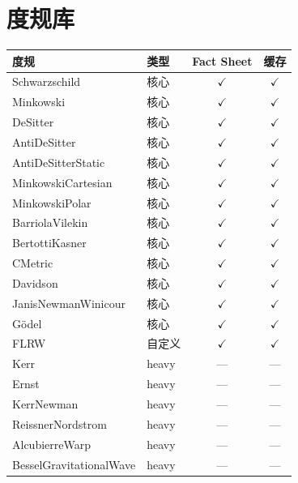 \documentclass[11pt,a4paper]{article}
\begin{document}
\section{度规库}

\begin{table}[h]\centering\small
\begin{tabular}{llcc}
\toprule
\textbf{度规} & \textbf{类型} & \textbf{Fact Sheet} & \textbf{缓存} \\
\midrule
Schwarzschild           & 核心   & $\checkmark$ & $\checkmark$ \\
Minkowski               & 核心   & $\checkmark$ & $\checkmark$ \\
DeSitter                & 核心   & $\checkmark$ & $\checkmark$ \\
AntiDeSitter            & 核心   & $\checkmark$ & $\checkmark$ \\
AntiDeSitterStatic      & 核心   & $\checkmark$ & $\checkmark$ \\
MinkowskiCartesian      & 核心   & $\checkmark$ & $\checkmark$ \\
MinkowskiPolar          & 核心   & $\checkmark$ & $\checkmark$ \\
BarriolaVilekin         & 核心   & $\checkmark$ & $\checkmark$ \\
BertottiKasner          & 核心   & $\checkmark$ & $\checkmark$ \\
CMetric                 & 核心   & $\checkmark$ & $\checkmark$ \\
Davidson                & 核心   & $\checkmark$ & $\checkmark$ \\
JanisNewmanWinicour     & 核心   & $\checkmark$ & $\checkmark$ \\
G\"odel                 & 核心   & $\checkmark$ & $\checkmark$ \\
FLRW                    & 自定义 & $\checkmark$ & $\checkmark$ \\
\midrule
Kerr                    & heavy & — & — \\
Ernst                   & heavy & — & — \\
KerrNewman              & heavy & — & — \\
ReissnerNordstrom       & heavy & — & — \\
AlcubierreWarp          & heavy & — & — \\
BesselGravitationalWave & heavy & — & — \\
\bottomrule
\end{tabular}
\end{table}
\end{document}
